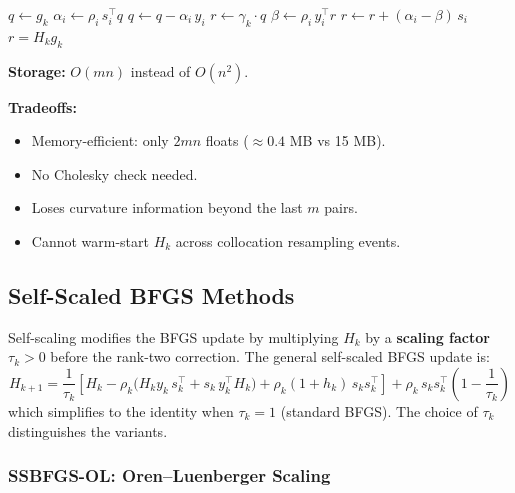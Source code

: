\documentclass[11pt,a4paper]{article}
\newcommand{\Hk}{H_k}
\newcommand{\Hkp}{H_{k+1}}
\newcommand{\sk}{s_k}
\newcommand{\yk}{y_k}
\newcommand{\gk}{g_k}
\newcommand{\tp}{\tau_k}
\begin{document}
\begin{algorithm}[H]
\caption{L-BFGS Two-Loop Recursion}
\begin{algorithmic}[1]
\State $q \gets \gk$
  \State $\alpha_i \gets \rho_i \, s_i^\top q$
  \State $q \gets q - \alpha_i \, y_i$
\EndFor
\State $r \gets \gamma_k \cdot q$ 
  \State $\beta \gets \rho_i \, y_i^\top r$
  \State $r \gets r + (\alpha_i - \beta)\, s_i$
\EndFor
\State \Return $r = \Hk \gk$
\end{algorithmic}
\end{algorithm}

\textbf{Storage:} $O(mn)$ instead of $O(n^2)$.

\textbf{Tradeoffs:}
\begin{itemize}[nosep]
  \item[\textcolor{green!60!black}{$+$}] Memory-efficient: only $2mn$ floats ($\approx 0.4$ MB vs 15 MB).
  \item[\textcolor{green!60!black}{$+$}] No Cholesky check needed.
  \item[\textcolor{red!70!black}{$-$}] Loses curvature information beyond the last $m$ pairs.
  \item[\textcolor{red!70!black}{$-$}] Cannot warm-start $\Hk$ across collocation resampling events.
\end{itemize}

\subsection{Self-Scaled BFGS Methods}
\label{sec:ssbfgs}

Self-scaling modifies the BFGS update by multiplying $\Hk$ by a
\textbf{scaling factor} $\tp > 0$ before the rank-two correction.
The general self-scaled BFGS update is:
\begin{equation}
\boxed{
  \Hkp = \frac{1}{\tp}\!\left[\Hk
    - \rho_k\big(\Hk \yk\, \sk^\top + \sk\, \yk^\top \Hk\big)
    + \rho_k(1 + h_k)\,\sk \sk^\top\right]
    + \rho_k \,\sk \sk^\top \left(1 - \frac{1}{\tp}\right)
}
\label{eq:ssbfgs_general}
\end{equation}
which simplifies to the identity when $\tp = 1$ (standard BFGS).
The choice of $\tp$ distinguishes the variants.

\subsubsection{SSBFGS-OL: Oren--Luenberger Scaling}
\label{sec:ssbfgs_ol}
\end{document}
